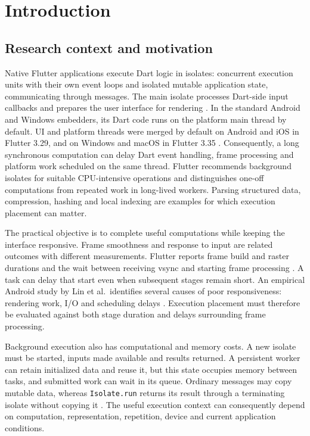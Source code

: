 \documentclass[14pt,a4paper,oneside]{extreport}
\begin{document}
\setcounter{page}{2}
\tableofcontents
\clearpage
\chapter{Introduction}
\label{introduction}

\section{Research context and motivation}
\label{research-context-and-motivation}

Native Flutter applications execute Dart logic in isolates: concurrent execution units with
their own event loops and isolated mutable application state, communicating through messages.
The main isolate processes Dart-side input callbacks and prepares the user interface for
rendering \citep{flutter-isolates}. In the standard Android and Windows embedders, its
Dart code runs on the platform main thread by default. UI and platform threads were merged
by default on Android and iOS in Flutter 3.29, and on Windows and macOS in Flutter 3.35
\citep{flutter-thread-merge}. Consequently, a long synchronous computation can delay Dart
event handling, frame processing and platform work scheduled on the same thread. Flutter
recommends background isolates for suitable CPU-intensive operations and distinguishes
one-off computations from repeated work in long-lived workers. Parsing structured data, compression,
hashing and local indexing are examples for which execution placement can matter.

The practical objective is to complete useful computations while keeping the interface
responsive. Frame smoothness and response to input are related outcomes with different
measurements. Flutter reports frame build and raster durations and the wait between receiving
vsync and starting frame processing \citep{flutter-frame}. A task can delay that start even
when subsequent stages remain short. An empirical Android study by Lin et al.~identifies
several causes of poor responsiveness: rendering work, I/O and scheduling delays
\citep{lin2024}. Execution placement must therefore be evaluated against both stage duration
and delays surrounding frame processing.

Background execution also has computational and memory costs. A new isolate must be started,
inputs made available and results returned. A persistent worker can retain initialized data
and reuse it, but this state occupies memory between tasks, and submitted work can wait in its
queue. Ordinary messages may copy mutable data, whereas \texttt{Isolate.run} returns its
result through a terminating isolate without copying it \citep{dart-run, dart-send}. The
useful execution context can consequently depend on computation, representation, repetition,
device and current application conditions.
\end{document}
